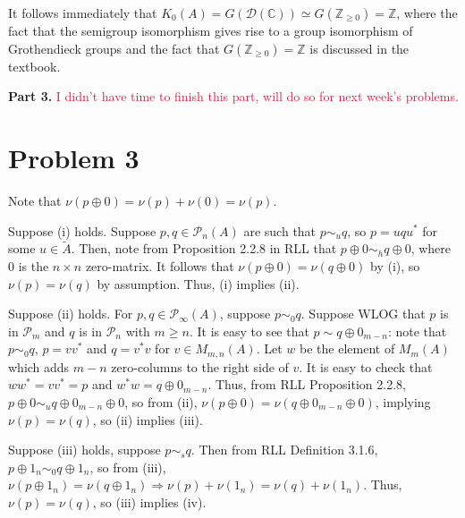\documentclass[aps,pra,showpacs,notitlepage,onecolumn,superscriptaddress,nofootinbib]{revtex4-1}
\newcommand{\pop}[1]{\textcolor{crimson}{#1}}
\newcommand{\hhrulefill}{\hspace{-1.0em}\hrulefill}
\theoremstyle{definition}
\begin{document}
\noindent It follows immediately that $K_0(A) = G(\mathcal{D}(\mathbb{C})) \simeq G(\mathbb{Z}_{\geq 0}) = \mathbb{Z}$, where the fact that the semigroup isomorphism gives rise to a group isomorphism of Grothendieck groups and the fact that $G(\mathbb{Z}_{\geq 0}) = \mathbb{Z}$ is discussed in the textbook.
\newline

\noindent \textbf{Part 3.} \pop{I didn't have time to finish this part, will do so for next week's problems.}

\hhrulefill

\section{Problem 3}

\noindent Note that $\nu(p \oplus 0) = \nu(p) + \nu(0) = \nu(p)$.
\newline

\noindent Suppose (i) holds. Suppose $p, q \in \mathcal{P}_n(A)$ are such that $p \sim_u q$, so $p = u q u^{*}$ for some $u \in \widetilde{A}$. Then, note from Proposition 2.2.8 in RLL that $p \oplus 0 \sim_h q \oplus 0$,
where $0$ is the $n \times n$ zero-matrix. It follows that $\nu(p \oplus 0) = \nu(q \oplus 0)$ by (i), so $\nu(p) = \nu(q)$ by assumption. Thus, (i) implies (ii).
\newline

\noindent Suppose (ii) holds. For $p, q \in \mathcal{P}_{\infty}(A)$, suppose $p \sim_0 q$. Suppose WLOG that $p$ is in $\mathcal{P}_m$ and $q$ is in $\mathcal{P}_n$ with $m \geq n$. It is easy to see that $p \sim q \oplus 0_{m - n}$:
note that $p \sim_0 q$, $p = v v^{*}$ and $q = v^{*} v$ for $v \in M_{m, n}(A)$. Let $w$ be the element of $M_{m}(A)$ which adds $m - n$ zero-columns to the right side of $v$. It is easy to check that $w w^{*} = v v^{*} = p$
and $w^{*} w = q \oplus 0_{m - n}$. Thus, from RLL Proposition 2.2.8, $p \oplus 0 \sim_u q \oplus 0_{m - n} \oplus 0$, so from (ii), $\nu(p \oplus 0) = \nu(q \oplus 0_{m - n} \oplus 0)$, implying $\nu(p) = \nu(q)$, so (ii) implies (iii).
\newline

\noindent Suppose (iii) holds, suppose $p \sim_s q$. Then from RLL Definition 3.1.6, $p \oplus 1_n \sim_0 q \oplus 1_n$, so from (iii), $\nu(p \oplus 1_n) = \nu(q \oplus 1_n) \Rightarrow \nu(p) + \nu(1_n) = \nu(q) + \nu(1_n)$.
Thus, $\nu(p) = \nu(q)$, so (iii) implies (iv).
\newline
\end{document}
